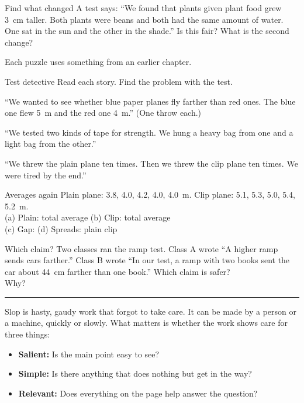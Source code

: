 \begin{puzzle}{Find what changed}
A test says: ``We found that plants given plant food grew 3~cm taller. Both plants were beans and both had the same amount of water. One sat in the sun and the other in the shade.'' Is this fair? \wline[2cm] What is the second change? \wline[3.4cm]
\end{puzzle}

\clearpage
\thispagestyle{fancy}
Each puzzle uses something from an earlier chapter.

\begin{puzzle}{Test detective}
Read each story. Find the problem with the test.
\begin{description}[leftmargin=1.6em,itemsep=0.4em,style=sameline]
\item[(a)] ``We wanted to see whether blue paper planes fly farther than red ones. The blue one flew 5~m and the red one 4~m.'' (One throw each.) \wline[3cm]
\item[(b)] ``We tested two kinds of tape for strength. We hung a heavy bag from one and a light bag from the other.'' \wline[3cm]
\item[(c)] ``We threw the plain plane ten times. Then we threw the clip plane ten times. We were tired by the end.'' \wline[3cm]
\end{description}
\end{puzzle}

\begin{puzzle}{Averages again}
Plain plane: 3.8, 4.0, 4.2, 4.0, 4.0~m. Clip plane: 5.1, 5.3, 5.0, 5.4, 5.2~m.\\
(a) Plain: total \wline[1.3cm] average \wline[1.3cm] \quad (b) Clip: total \wline[1.3cm] average \wline[1.3cm]\\
(c) Gap: \wline[1.3cm] \quad (d) Spreads: plain \wline[1.2cm] clip \wline[1.2cm]
\end{puzzle}

\begin{puzzle}{Which claim?}
Two classes ran the ramp test. Class A wrote ``A higher ramp sends cars farther.'' Class B wrote ``In our test, a ramp with two books sent the car about 44~cm farther than one book.'' Which claim is safer? \wline[2cm]\\
Why?\\
\rule{\linewidth}{0.5pt}
\end{puzzle}

\clearpage
\thispagestyle{fancy}\label{slop}
Slop is hasty, gaudy work that forgot to take care. It can be made by a person or a machine, quickly or slowly. What matters is whether the work shows care for three things:
\begin{itemize}[leftmargin=1.6em]
\item \textbf{Salient:} Is the main point easy to see?
\item \textbf{Simple:} Is there anything that does nothing but get in the way?
\item \textbf{Relevant:} Does everything on the page help answer the question?
\end{itemize}

